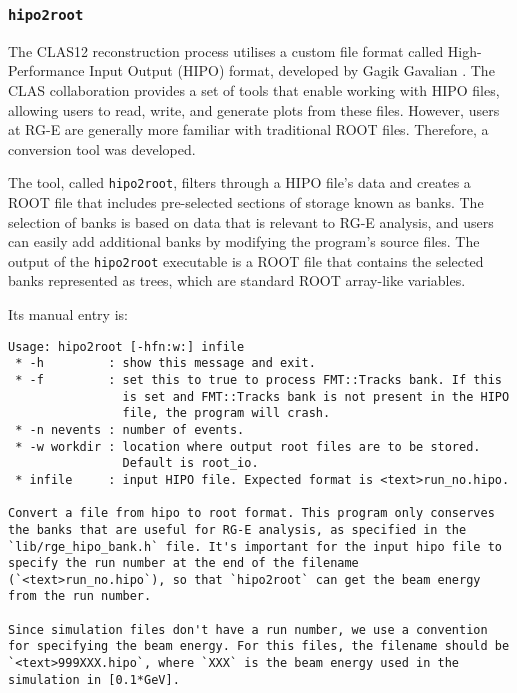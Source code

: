 \subsubsection{\texttt{hipo2root}}
\label{13.11::hipo2root}
    The CLAS12 reconstruction process utilises a custom file format called High-Performance Input Output (HIPO) format, developed by Gagik Gavalian \cite{chekanov2021}.
    The CLAS collaboration provides a set of tools that enable working with HIPO files, allowing users to read, write, and generate plots from these files.
    However, users at RG-E are generally more familiar with traditional ROOT files. Therefore, a conversion tool was developed.

    The tool, called \texttt{hipo2root}, filters through a HIPO file's data and creates a ROOT file that includes pre-selected sections of storage known as banks.
    The selection of banks is based on data that is relevant to RG-E analysis, and users can easily add additional banks by modifying the program's source files.
    The output of the \texttt{hipo2root} executable is a ROOT file that contains the selected banks represented as trees, which are standard ROOT array-like variables.

    Its manual entry is:
    \begin{lstlisting}
Usage: hipo2root [-hfn:w:] infile
 * -h         : show this message and exit.
 * -f         : set this to true to process FMT::Tracks bank. If this
                is set and FMT::Tracks bank is not present in the HIPO
                file, the program will crash.
 * -n nevents : number of events.
 * -w workdir : location where output root files are to be stored.
                Default is root_io.
 * infile     : input HIPO file. Expected format is <text>run_no.hipo.

Convert a file from hipo to root format. This program only conserves the banks that are useful for RG-E analysis, as specified in the `lib/rge_hipo_bank.h` file. It's important for the input hipo file to specify the run number at the end of the filename (`<text>run_no.hipo`), so that `hipo2root` can get the beam energy from the run number.

Since simulation files don't have a run number, we use a convention for specifying the beam energy. For this files, the filename should be `<text>999XXX.hipo`, where `XXX` is the beam energy used in the simulation in [0.1*GeV].
    \end{lstlisting}
